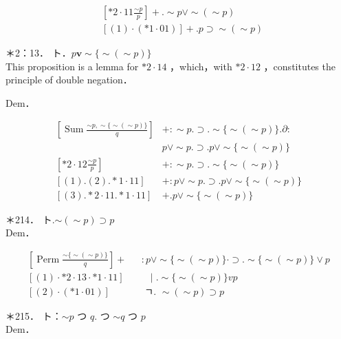 \documentclass[10pt]{article}
\begin{document}
\begin{align*}
& {\left[* 2 \cdot 11 \frac{\sim p}{p}\right]+. \sim p \vee \sim(\sim p)}  \tag{1}\\
& {[(1) \cdot(* 1 \cdot 01)]+. p \supset \sim(\sim p)}
\end{align*}


＊2：13． ト．$p \mathbf{v} \sim\{\sim(\sim p)\}$\\
This proposition is a lemma for $* 2 \cdot 14$ ，which，with $* 2 \cdot 12$ ，constitutes the principle of double negation．

Dem．

\[
\begin{array}{ll}
{\left[\operatorname{Sum} \frac{\sim p, \sim\{\sim(\sim p)\}}{q}\right]} & +: \sim p . \supset . \sim\{\sim(\sim p)\} . \partial: \\
& p \vee \sim p . \supset . p \vee \sim\{\sim(\sim p)\} \\
{\left[* 2 \cdot 12 \frac{\sim p}{p}\right]} & +: \sim p . \supset . \sim\{\sim(\sim p)\} \\
{[(1) .(2) . * 1 \cdot 11]} & +: p \vee \sim p . \supset . p \vee \sim\{\sim(\sim p)\} \\
{[(3) . * 2 \cdot 11 . * 1 \cdot 11]} & +. p \vee \sim\{\sim(\sim p)\} \tag{3}
\end{array}
\]

＊214． ト.$\sim(\sim p) \supset p$\\
Dem．

\[
\begin{array}{ll}
{\left[\operatorname{Perm} \frac{\sim\{\sim(\sim p)\}}{q}\right]+} & : p \vee \sim\{\sim(\sim p)\} \cdot \supset . \sim\{\sim(\sim p)\} \vee p \\
{[(1) \cdot * 2 \cdot 13 \cdot * 1 \cdot 11] \quad} & \text { } \mid . \sim\{\sim(\sim p)\} v p  \tag{2}\\
{[(2) \cdot(* 1 \cdot 01)] \quad} & \text { ㄱ. } \sim(\sim p) \supset p
\end{array}
\]

＊215． ト：$\sim p$ つ $q$. つ $\sim q$ つ $p$\\
Dem．
\end{document}
